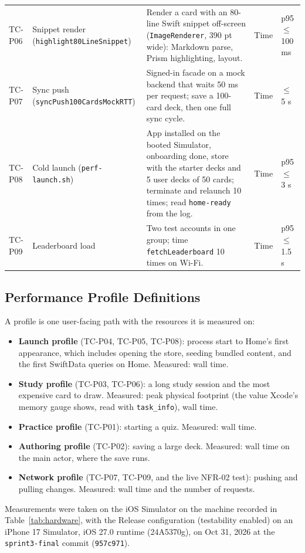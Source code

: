 \documentclass[12pt,letterpaper]{article}
\begin{document}
\begin{xltabular}{\textwidth}{@{}L{1.3cm} L{2.6cm} Y L{2.3cm} L{1.9cm}@{}}
TC-P06 & Snippet render (\texttt{highlight80LineSnippet}) & Render a card with an 80-line Swift snippet off-screen (\texttt{ImageRenderer}, 390 pt wide): Markdown parse, Prism highlighting, layout. & Time & p95 $\le$ 100 ms \\
TC-P07 & Sync push (\texttt{syncPush100CardsMockRTT}) & Signed-in facade on a mock backend that waits 50 ms per request; save a 100-card deck, then one full sync cycle. & Time & $\le$ 5 s \\
TC-P08 & Cold launch (\texttt{perf-launch.sh}) & App installed on the booted Simulator, onboarding done, store with the starter decks and 5 user decks of 50 cards; terminate and relaunch 10 times; read \texttt{home-ready} from the log. & Time & p95 $\le$ 3 s \\
TC-P09 & Leaderboard load & Two test accounts in one group; time \texttt{fetchLeaderboard} 10 times on Wi-Fi. & Time & p95 $\le$ 1.5 s \\
\end{xltabular}

\subsection{Performance Profile Definitions}
A profile is one user-facing path with the resources it is measured on:
\begin{itemize}
  \item \textbf{Launch profile} (TC-P04, TC-P05, TC-P08): process start to Home's first
        appearance, which includes opening the store, seeding bundled content, and the
        first SwiftData queries on Home. Measured: wall time.
  \item \textbf{Study profile} (TC-P03, TC-P06): a long study session and the most
        expensive card to draw. Measured: peak physical footprint (the value Xcode's
        memory gauge shows, read with \texttt{task\_info}), wall time.
  \item \textbf{Practice profile} (TC-P01): starting a quiz. Measured: wall time.
  \item \textbf{Authoring profile} (TC-P02): saving a large deck. Measured: wall time
        on the main actor, where the save runs.
  \item \textbf{Network profile} (TC-P07, TC-P09, and the live NFR-02 test): pushing
        and pulling changes. Measured: wall time and the number of requests.
\end{itemize}
Measurements were taken on the iOS Simulator on the machine recorded in
Table~\ref{tab:hardware}, with the Release configuration (testability enabled) on an
iPhone 17 Simulator, iOS 27.0 runtime (24A5370g), on Oct 31, 2026 at the
\texttt{sprint3-final} commit (\texttt{957c971}).
\end{document}
